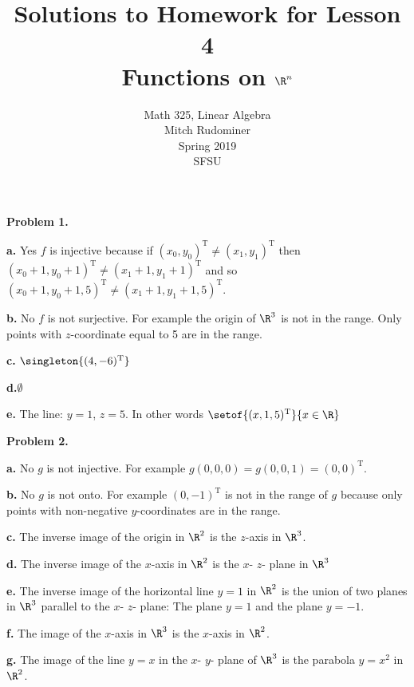 \documentclass[oneside,12pt]{amsart}
\begin{document}
\title{Solutions to Homework for Lesson 4 \\ Functions on $\R^n$}
\author{Math 325, Linear Algebra \\ Mitch Rudominer \\ Spring 2019 \\ SFSU }
\date{}

\maketitle


\textbf{Problem 1.}

\textbf{a.} Yes $f$ is injective because if $(x_0, y_0)^{\text{T}} \not= (x_1, y_1)^{\text{T}}$
then $(x_0 +1 , y_0 +1)^{\text{T}} \not= (x_1 +1 , y_1 +1)^{\text{T}}$ and so
 $(x_0 +1 , y_0 +1, 5)^{\text{T}} \not= (x_1 +1 , y_1 +1, 5)^{\text{T}}$.


\textbf{b.} No $f$ is not surjective. For example the origin of $\R^3$ is not in
the range. Only points with $z$-coordinate equal to 5 are in the range.


\textbf{c.} $\singleton{(4, -6)^{\text{T}}}$


\textbf{d.}$\emptyset$


\textbf{e.} The line: $y=1$, $z=5$. In other words $\setof{(x,1,5)^{\text{T}}}{x\in\R}$

\medskip

\textbf{Problem 2.}

\textbf{a.} No $g$ is not injective. For example
$g(0,0,0) = g(0, 0,1) = (0,0)^{\text{T}}$.


\textbf{b.} No $g$ is not onto. For example $(0, -1)^{\text{T}}$ is not in the range of
$g$ because only points with non-negative $y$-coordinates are in the range.


\textbf{c.} The inverse image of the origin in $\R^2$ is the $z$-axis in $\R^3$.


\textbf{d.} The inverse image of the $x$-axis in $\R^2$ is the $x$- $z$- plane
in $\R^3$

\textbf{e.} The inverse image of the horizontal line $y=1$ in $\R^2$ is
the union of two planes in $\R^3$ parallel to the $x$- $z$- plane: The
plane $y=1$ and the plane $y=-1$.

\textbf{f.} The image of the $x$-axis in $\R^3$ is the $x$-axis in $\R^2$.

\textbf{g.} The  image of the line $y=x$ in the $x$- $y$- plane
of $\R^3$ is the parabola $y=x^2$ in $\R^2$.


\medskip
\end{document}
